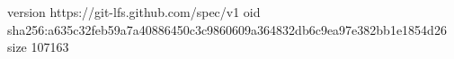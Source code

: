 version https://git-lfs.github.com/spec/v1
oid sha256:a635c32feb59a7a40886450c3c9860609a364832db6c9ea97e382bb1e1854d26
size 107163
